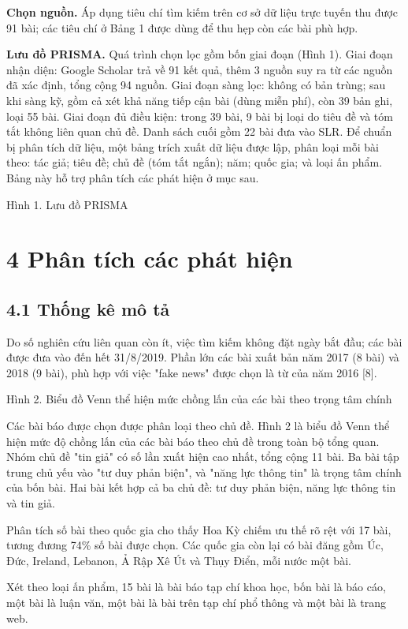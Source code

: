 \textbf{Chọn nguồn.} Áp dụng tiêu chí tìm kiếm trên cơ sở dữ liệu trực tuyến thu được 91 bài; các tiêu chí ở Bảng 1 được dùng để thu hẹp còn các bài phù hợp.

\textbf{Lưu đồ PRISMA.} Quá trình chọn lọc gồm bốn giai đoạn (Hình 1). Giai đoạn nhận diện: Google Scholar trả về 91 kết quả, thêm 3 nguồn suy ra từ các nguồn đã xác định, tổng cộng 94 nguồn. Giai đoạn sàng lọc: không có bản trùng; sau khi sàng kỹ, gồm cả xét khả năng tiếp cận bài (dùng miễn phí), còn 39 bản ghi, loại 55 bài. Giai đoạn đủ điều kiện: trong 39 bài, 9 bài bị loại do tiêu đề và tóm tắt không liên quan chủ đề. Danh sách cuối gồm 22 bài đưa vào SLR. Để chuẩn bị phân tích dữ liệu, một bảng trích xuất dữ liệu được lập, phân loại mỗi bài theo: tác giả; tiêu đề; chủ đề (tóm tắt ngắn); năm; quốc gia; và loại ấn phẩm. Bảng này hỗ trợ phân tích các phát hiện ở mục sau.

Hình 1. Lưu đồ PRISMA

\section{4 Phân tích các phát hiện}

\subsection{4.1 Thống kê mô tả}

Do số nghiên cứu liên quan còn ít, việc tìm kiếm không đặt ngày bắt đầu; các bài được đưa vào đến hết 31/8/2019. Phần lớn các bài xuất bản năm 2017 (8 bài) và 2018 (9 bài), phù hợp với việc "fake news" được chọn là từ của năm 2016 {[}8{]}.

Hình 2. Biểu đồ Venn thể hiện mức chồng lấn của các bài theo trọng tâm chính

Các bài báo được chọn được phân loại theo chủ đề. Hình 2 là biểu đồ Venn thể hiện mức độ chồng lấn của các bài báo theo chủ đề trong toàn bộ tổng quan. Nhóm chủ đề "tin giả" có số lần xuất hiện cao nhất, tổng cộng 11 bài. Ba bài tập trung chủ yếu vào "tư duy phản biện", và "năng lực thông tin" là trọng tâm chính của bốn bài. Hai bài kết hợp cả ba chủ đề: tư duy phản biện, năng lực thông tin và tin giả.

Phân tích số bài theo quốc gia cho thấy Hoa Kỳ chiếm ưu thế rõ rệt với 17 bài, tương đương 74\% số bài được chọn. Các quốc gia còn lại có bài đăng gồm Úc, Đức, Ireland, Lebanon, Ả Rập Xê Út và Thụy Điển, mỗi nước một bài.

Xét theo loại ấn phẩm, 15 bài là bài báo tạp chí khoa học, bốn bài là báo cáo, một bài là luận văn, một bài là bài trên tạp chí phổ thông và một bài là trang web.

